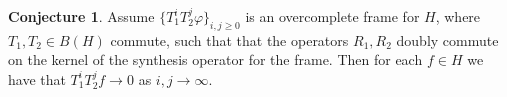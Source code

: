 \documentclass[12pt,reqno]{amsart}
\theoremstyle{definition}
\newtheorem{conjecture}[theorem]{Conjecture}
\theoremstyle{definition}
\newtheorem{proposition}[theorem]{Proposition}
\numberwithin{equation}{section}
\begin{document}
\begin{conjecture}
 Assume $\{T_1^iT_2^j\varphi\}_{i,j \geq 0}$ is an overcomplete frame for $H$, where $T_1, T_2  \in B(H)$ commute, such that that the operators $R_1, R_2$ doubly commute on the kernel of the synthesis operator  for the frame. Then for each $f \in H$ we have that  $T_1^iT_2^jf \to 0$ as $i, j \to \infty$.
\end{conjecture}

\end{document}
